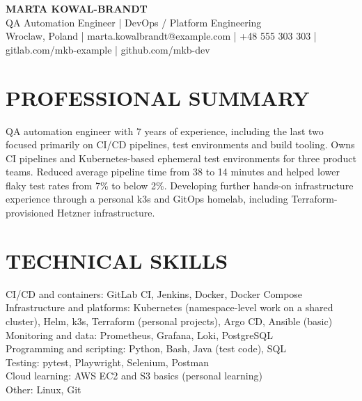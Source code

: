 \documentclass[11pt,a4paper]{article}
\begin{document}
\begin{center}
{\LARGE\bfseries MARTA KOWAL-BRANDT}\\
{\large QA Automation Engineer | DevOps / Platform Engineering}\\
Wroclaw, Poland | marta.kowalbrandt@example.com | +48 555 303 303 | gitlab.com/mkb-example | github.com/mkb-dev
\end{center}

\section*{PROFESSIONAL SUMMARY}
QA automation engineer with 7 years of experience, including the last two focused primarily on CI/CD pipelines, test environments and build tooling. Owns CI pipelines and Kubernetes-based ephemeral test environments for three product teams. Reduced average pipeline time from 38 to 14 minutes and helped lower flaky test rates from 7\% to below 2\%. Developing further hands-on infrastructure experience through a personal k3s and GitOps homelab, including Terraform-provisioned Hetzner infrastructure.

\section*{TECHNICAL SKILLS}
CI/CD and containers: GitLab CI, Jenkins, Docker, Docker Compose\\
Infrastructure and platforms: Kubernetes (namespace-level work on a shared cluster), Helm, k3s, Terraform (personal projects), Argo CD, Ansible (basic)\\
Monitoring and data: Prometheus, Grafana, Loki, PostgreSQL\\
Programming and scripting: Python, Bash, Java (test code), SQL\\
Testing: pytest, Playwright, Selenium, Postman\\
Cloud learning: AWS EC2 and S3 basics (personal learning)\\
Other: Linux, Git
\end{document}
